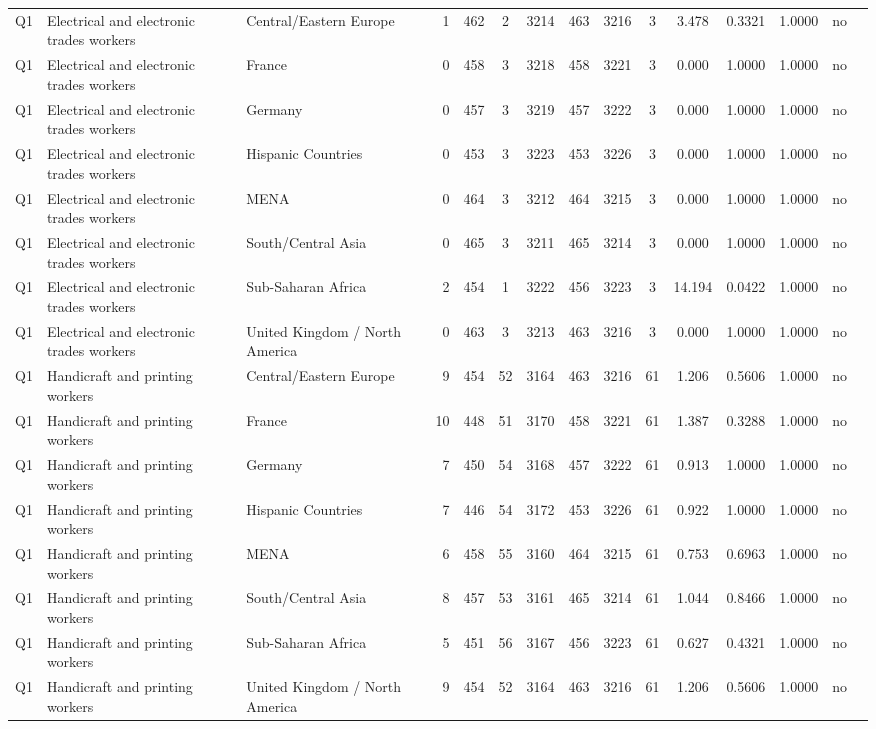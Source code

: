 \begin{longtable}{lllrcccccccccll}
Q1 & Electrical and electronic trades workers & Central/Eastern Europe & 1 & 462 & 2 & 3214 & 463 & 3216 & 3 & 3.478 & 0.3321 & 1.0000 & no \\
Q1 & Electrical and electronic trades workers & France & 0 & 458 & 3 & 3218 & 458 & 3221 & 3 & 0.000 & 1.0000 & 1.0000 & no \\
Q1 & Electrical and electronic trades workers & Germany & 0 & 457 & 3 & 3219 & 457 & 3222 & 3 & 0.000 & 1.0000 & 1.0000 & no \\
Q1 & Electrical and electronic trades workers & Hispanic Countries & 0 & 453 & 3 & 3223 & 453 & 3226 & 3 & 0.000 & 1.0000 & 1.0000 & no \\
Q1 & Electrical and electronic trades workers & MENA & 0 & 464 & 3 & 3212 & 464 & 3215 & 3 & 0.000 & 1.0000 & 1.0000 & no \\
Q1 & Electrical and electronic trades workers & South/Central Asia & 0 & 465 & 3 & 3211 & 465 & 3214 & 3 & 0.000 & 1.0000 & 1.0000 & no \\
Q1 & Electrical and electronic trades workers & Sub-Saharan Africa & 2 & 454 & 1 & 3222 & 456 & 3223 & 3 & 14.194 & 0.0422 & 1.0000 & no \\
Q1 & Electrical and electronic trades workers & United Kingdom / North America & 0 & 463 & 3 & 3213 & 463 & 3216 & 3 & 0.000 & 1.0000 & 1.0000 & no \\
Q1 & Handicraft and printing workers & Central/Eastern Europe & 9 & 454 & 52 & 3164 & 463 & 3216 & 61 & 1.206 & 0.5606 & 1.0000 & no \\
Q1 & Handicraft and printing workers & France & 10 & 448 & 51 & 3170 & 458 & 3221 & 61 & 1.387 & 0.3288 & 1.0000 & no \\
Q1 & Handicraft and printing workers & Germany & 7 & 450 & 54 & 3168 & 457 & 3222 & 61 & 0.913 & 1.0000 & 1.0000 & no \\
Q1 & Handicraft and printing workers & Hispanic Countries & 7 & 446 & 54 & 3172 & 453 & 3226 & 61 & 0.922 & 1.0000 & 1.0000 & no \\
Q1 & Handicraft and printing workers & MENA & 6 & 458 & 55 & 3160 & 464 & 3215 & 61 & 0.753 & 0.6963 & 1.0000 & no \\
Q1 & Handicraft and printing workers & South/Central Asia & 8 & 457 & 53 & 3161 & 465 & 3214 & 61 & 1.044 & 0.8466 & 1.0000 & no \\
Q1 & Handicraft and printing workers & Sub-Saharan Africa & 5 & 451 & 56 & 3167 & 456 & 3223 & 61 & 0.627 & 0.4321 & 1.0000 & no \\
Q1 & Handicraft and printing workers & United Kingdom / North America & 9 & 454 & 52 & 3164 & 463 & 3216 & 61 & 1.206 & 0.5606 & 1.0000 & no \\

\end{longtable}
